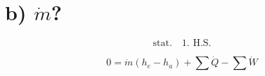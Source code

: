 \section*{b) $\dot{m}$?}

\[
\text{stat.} \quad \text{1. H.S.}
\]

\[
0 = \dot{m} (h_e - h_a) + \sum \dot{Q} - \sum \dot{W}
\]